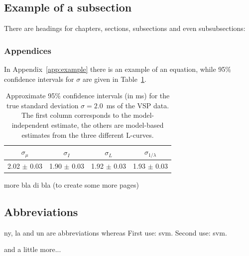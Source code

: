 \subsection{Example of a subsection}

There are headings for chapters, sections, subsections and even
subsubsections:

\subsubsection{Appendices}

In Appendix~\ref{app:example} there is an example of an equation,
while 95\% confidence intervals for $\sigma$ are given in
Table~\ref{table:sigma}.
\begin{table}
  \caption{Approximate 95\% confidence intervals (in ms) for the true 
    standard deviation $\sigma=2.0$~ms of the VSP data. 
    The first column corresponds to the model-independent estimate, 
    the others are model-based estimates from the three different L-curves.} 
  \begin{center} 
    \begin{tabular}{|c|c|c|c|}\hline 
      $\sigma_\mu$  & $\sigma_I$ &$\sigma_{L}$  &$\sigma_{1/\lambda}$  \\
      \hline  
      2.02 $\pm$ 0.03 & 1.90 $\pm$ 0.03  & 1.92 $\pm$ 0.03 & 1.93 $\pm$ 0.03 
      \\ \hline 
    \end{tabular} 
    \label{table:sigma} 
  \end{center} 
\end{table} 

\newpage

more bla di bla (to create some more pages)


\subsection{Abbreviations}

\gls{ny}, \gls{la} and \gls{un} are abbreviations whereas
First use: \gls{svm}. Second use: \gls{svm}.



\newpage 

and a little more...


